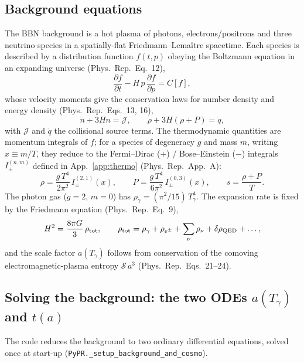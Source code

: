 \documentclass[11pt,a4paper]{article}
\newcommand{\Tg}{T_\gamma}
\newcommand{\code}[1]{\texttt{#1}}
\newcommand{\PR}{Phys.\ Rep.}
\begin{document}
\subsection{Background equations}
The BBN background is a hot plasma of photons, electrons/positrons and three
neutrino species in a spatially-flat Friedmann--Lema\^itre spacetime. Each
species is described by a distribution function $f(t,p)$ obeying the Boltzmann
equation in an expanding universe (\PR\ Eq.~12),
\begin{equation}
  \frac{\partial f}{\partial t} - H\,p\,\frac{\partial f}{\partial p}
  = C[f],
\end{equation}
whose velocity moments give the conservation laws for number density and energy
density (\PR\ Eqs.~13, 16),
\begin{equation}
  \dot n + 3 H n = \mathcal{J}, \qquad
  \dot\rho + 3H(\rho+P) = \dot q,
\label{eq:cons}
\end{equation}
with $\mathcal{J}$ and $\dot q$ the collisional source terms. The thermodynamic
quantities are momentum integrals of $f$; for a species of degeneracy $g$ and
mass $m$, writing $x\equiv m/T$, they reduce to the Fermi--Dirac ($+$) /
Bose--Einstein ($-$) integrals $I^{(n,m)}_\pm$ defined in
App.~\ref{app:thermo} (\PR\ App.~A):
\begin{equation}
  \rho = \frac{g\,T^4}{2\pi^2}\, I^{(2,1)}_\pm(x), \qquad
  P    = \frac{g\,T^4}{6\pi^2}\, I^{(0,3)}_\pm(x), \qquad
  s    = \frac{\rho+P}{T}.
\label{eq:thermo}
\end{equation}
The photon gas ($g=2$, $m=0$) has $\rho_\gamma = (\pi^2/15)\,\Tg^4$. The
expansion rate is fixed by the Friedmann equation (\PR\ Eq.~9),
\begin{equation}
  H^2 = \frac{8\pi G}{3}\,\rho_{\rm tot},
  \qquad
  \rho_{\rm tot} = \rho_\gamma + \rho_{e^\pm} + \sum_\nu \rho_\nu
                   + \delta\rho_{\rm QED} + \dots,
\label{eq:friedmann}
\end{equation}
and the scale factor $a(\Tg)$ follows from conservation of the comoving
electromagnetic-plasma entropy $\mathcal{S}\,a^3$ (\PR\ Eqs.~21--24).

\subsection{Solving the background: the two ODEs $a(\Tg)$ and $t(a)$}
\label{sec:bckg-ode}
The code reduces the background to two ordinary differential equations, solved
once at start-up (\code{PyPR.\_setup\_background\_and\_cosmo}).
\end{document}
